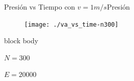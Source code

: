 \documentclass{beamer}
\begin{document}
            \begin{frame}{Presión vs Tiempo con $v=1m/s$}{Presión}
                    \begin{figure}[H!]
                        \texttt{[image: ./va\_vs\_time-n300]}
                        \label{fig:va_4}
                    \end{figure}
                    \begin{beamercolorbox}[sep=5pt,center]{block body}
                        \begin{minipage}[t]{0.45\textwidth}
                            \centering
                            \small{$N=300$}
                        \end{minipage}
                        \hfill
                        \begin{minipage}[t]{0.45\textwidth}
                            \centering
                            \small{$E=20000$}
                        \end{minipage}
                    \end{beamercolorbox}
            \end{frame}
\end{document}

